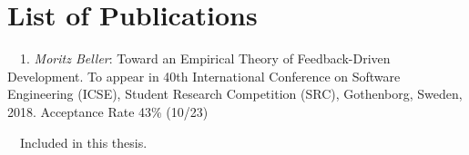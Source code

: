 \chapter*{List of Publications}
\label{publications}

\begin{etaremune}{\small
\item[\faFileTextO~~1.] \emph{Moritz Beller}: Toward an Empirical Theory of
  Feedback-Driven Development. To appear in 40th International Conference on
  Software Engineering (ICSE), Student Research Competition (SRC),
  Gothenborg, Sweden, 2018. Acceptance Rate 43\% (10/23)
}\end{etaremune}

\vspace{0.5cm}
\noindent
\faFileTextO~~Included in this thesis.\\
